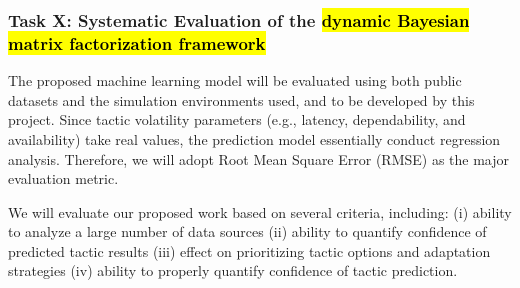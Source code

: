 \documentclass[12pt]{article}
\begin{document}










\subsubsection{Task X: Systematic Evaluation of the \hl{dynamic Bayesian matrix factorization framework}} 
The proposed machine learning model will be evaluated using both public datasets and the simulation environments used, and to be developed by this project. Since tactic volatility parameters (e.g., latency, dependability, and availability) take real values, the prediction model essentially conduct regression analysis. Therefore, we will adopt Root Mean Square Error (RMSE) as the major evaluation metric. 




We will evaluate our proposed work based on several criteria, including: (i) ability to analyze a large number of data sources (ii) ability to quantify confidence of predicted tactic results (iii) effect on prioritizing tactic options and adaptation strategies (iv) ability to properly quantify confidence of tactic prediction.







\end{document}
